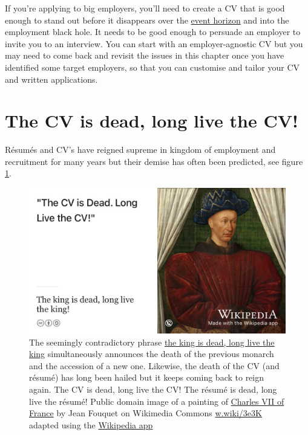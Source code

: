 \documentclass[
]{book}
\begin{document}
If you're applying to big employers, you'll need to create a CV that is good enough to stand out before it disappears over the \href{https://en.wikipedia.org/wiki/Event_horizon}{event horizon} and into the employment black hole. It needs to be good enough to persuade an employer to invite you to an interview. You can start with an employer-agnostic CV but you may need to come back and revisit the issues in this chapter once you have identified some target employers, so that you can customise and tailor your CV and written applications.

\hypertarget{dead}{%
\section{The CV is dead, long live the CV!}\label{dead}}

Résumés and CV's have reigned supreme in kingdom of employment and recruitment for many years but their demise has often been predicted, see figure \ref{fig:longlive-fig}.

\begin{figure}

{\centering \includegraphics[width=0.99\linewidth]{images/the-king-is-dead} 

}

\caption{The seemingly contradictory phrase \href{https://en.wikipedia.org/wiki/The_king_is_dead,_long_live_the_king!}{the king is dead, long live the king} simultaneously announces the death of the previous monarch and the accession of a new one. Likewise, the death of the CV (and résumé) has long been hailed but it keeps coming back to reign again. The CV is dead, long live the CV! The résumé is dead, long live the résumé! Public domain image of a painting of \href{https://en.wikipedia.org/wiki/Charles_VII_of_France}{Charles VII of France} by Jean Fouquet on Wikimedia Commons \href{https://w.wiki/3e3K}{w.wiki/3e3K} adapted using the \href{https://apps.apple.com/us/app/wikipedia/id324715238}{Wikipedia app}}\label{fig:longlive-fig}
\end{figure}
\end{document}
